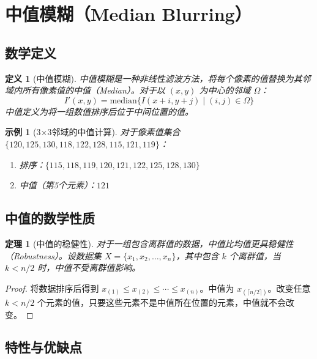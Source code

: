\documentclass{article}
\newtheorem{definition}{定义}[section]
\newtheorem{theorem}{定理}[section]
\newtheorem{example}{示例}[section]
\begin{document}
\section{中值模糊（Median Blurring）}

\subsection{数学定义}

\begin{definition}[中值模糊]
中值模糊是一种非线性滤波方法，将每个像素的值替换为其邻域内所有像素值的中值（Median）。对于以 $(x,y)$ 为中心的邻域 $\Omega$：
\[
I'(x,y) = \text{median}\{I(x+i, y+j) \mid (i,j) \in \Omega\}
\]
中值定义为将一组数值排序后位于中间位置的值。
\end{definition}

\begin{example}[3×3邻域的中值计算]
对于像素值集合 $\{120, 125, 130, 118, 122, 128, 115, 121, 119\}$：
\begin{enumerate}
    \item 排序：$\{115, 118, 119, 120, 121, 122, 125, 128, 130\}$
    \item 中值（第5个元素）：$121$
\end{enumerate}
\end{example}

\subsection{中值的数学性质}

\begin{theorem}[中值的稳健性]
对于一组包含离群值的数据，中值比均值更具稳健性（Robustness）。设数据集 $X = \{x_1, x_2, \dots, x_n\}$，其中包含 $k$ 个离群值，当 $k < n/2$ 时，中值不受离群值影响。
\end{theorem}

\begin{proof}
将数据排序后得到 $x_{(1)} \leq x_{(2)} \leq \cdots \leq x_{(n)}$。中值为 $x_{(\lceil n/2 \rceil)}$。改变任意 $k < n/2$ 个元素的值，只要这些元素不是中值所在位置的元素，中值就不会改变。
\end{proof}

\subsection{特性与优缺点}
\end{document}
